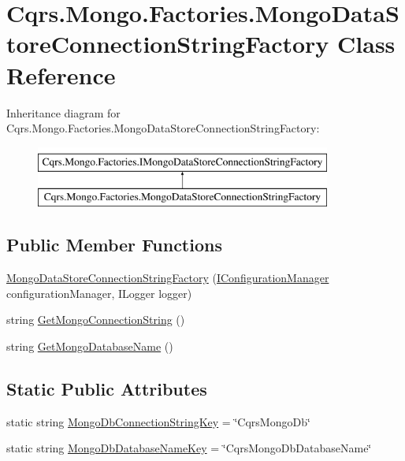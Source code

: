 \hypertarget{classCqrs_1_1Mongo_1_1Factories_1_1MongoDataStoreConnectionStringFactory}{}\section{Cqrs.\+Mongo.\+Factories.\+Mongo\+Data\+Store\+Connection\+String\+Factory Class Reference}
\label{classCqrs_1_1Mongo_1_1Factories_1_1MongoDataStoreConnectionStringFactory}
Inheritance diagram for Cqrs.\+Mongo.\+Factories.\+Mongo\+Data\+Store\+Connection\+String\+Factory\+:\begin{figure}[H]
\begin{center}
\leavevmode
\includegraphics[height=2.000000cm]{classCqrs_1_1Mongo_1_1Factories_1_1MongoDataStoreConnectionStringFactory}
\end{center}
\end{figure}
\subsection*{Public Member Functions}
\begin{DoxyCompactItemize}
\item 
\hyperlink{classCqrs_1_1Mongo_1_1Factories_1_1MongoDataStoreConnectionStringFactory_acad4a48959c7d40b5934663d1b71f414_acad4a48959c7d40b5934663d1b71f414}{Mongo\+Data\+Store\+Connection\+String\+Factory} (\hyperlink{interfaceCqrs_1_1Configuration_1_1IConfigurationManager}{I\+Configuration\+Manager} configuration\+Manager, I\+Logger logger)
\item 
string \hyperlink{classCqrs_1_1Mongo_1_1Factories_1_1MongoDataStoreConnectionStringFactory_a33064b1b1cbf06ef4f9e12371c7ef785_a33064b1b1cbf06ef4f9e12371c7ef785}{Get\+Mongo\+Connection\+String} ()
\item 
string \hyperlink{classCqrs_1_1Mongo_1_1Factories_1_1MongoDataStoreConnectionStringFactory_a7f330359f2db5b86ad28ac7d8a4c49f1_a7f330359f2db5b86ad28ac7d8a4c49f1}{Get\+Mongo\+Database\+Name} ()
\end{DoxyCompactItemize}
\subsection*{Static Public Attributes}
\begin{DoxyCompactItemize}
\item 
static string \hyperlink{classCqrs_1_1Mongo_1_1Factories_1_1MongoDataStoreConnectionStringFactory_a3740f3d23c33cc85377d4c9073f61c97_a3740f3d23c33cc85377d4c9073f61c97}{Mongo\+Db\+Connection\+String\+Key} = \char`\"{}Cqrs\+Mongo\+Db\char`\"{}
\item 
static string \hyperlink{classCqrs_1_1Mongo_1_1Factories_1_1MongoDataStoreConnectionStringFactory_afeca0c0e92ca9d9c83f15b2b03f769a8_afeca0c0e92ca9d9c83f15b2b03f769a8}{Mongo\+Db\+Database\+Name\+Key} = \char`\"{}Cqrs\+Mongo\+Db\+Database\+Name\char`\"{}
\end{DoxyCompactItemize}
